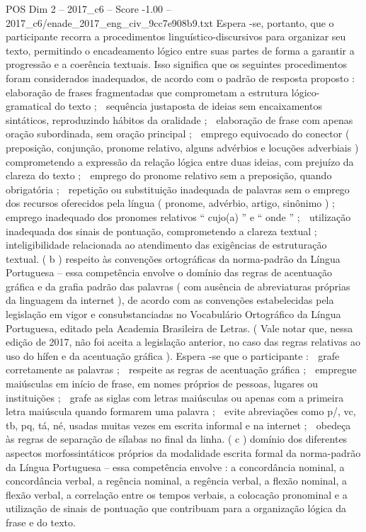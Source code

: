 \begin{textsample}{POS Dim 2 – 2017\_c6 – Score -1.00 – 2017\_c6/enade\_2017\_eng\_civ\_9cc7e908b9.txt}
Espera -se, portanto, que o participante recorra a procedimentos linguístico-discursivos para organizar seu texto, permitindo o encadeamento lógico entre suas partes de forma a garantir a progressão e a coerência textuais.
Isso significa que os seguintes procedimentos foram considerados inadequados, de acordo com o padrão de resposta proposto :  elaboração de frases fragmentadas que comprometam a estrutura lógico-gramatical do texto ;  sequência justaposta de ideias sem encaixamentos sintáticos, reproduzindo hábitos da oralidade ;  elaboração de frase com apenas oração subordinada, sem oração principal ;  emprego equivocado do conector ( preposição, conjunção, pronome relativo, alguns advérbios e locuções adverbiais ) comprometendo a expressão da relação lógica entre duas ideias, com prejuízo da clareza do texto ;  emprego do pronome relativo sem a preposição, quando obrigatória ;  repetição ou substituição inadequada de palavras sem o emprego dos recursos oferecidos pela língua ( pronome, advérbio, artigo, sinônimo ) ;  emprego inadequado dos pronomes relativos “ cujo(a) ” e “ onde ” ;  utilização inadequada dos sinais de pontuação, comprometendo a clareza textual ;  inteligibilidade relacionada ao atendimento das exigências de estruturação textual. ( b ) respeito às convenções ortográficas da norma-padrão da Língua Portuguesa – essa competência envolve o domínio das regras de acentuação gráfica e da grafia padrão das palavras ( com ausência de abreviaturas próprias da linguagem da internet ), de acordo com as convenções estabelecidas pela legislação em vigor e consubstanciadas no Vocabulário Ortográfico da Língua Portuguesa, editado pela Academia Brasileira de Letras. ( Vale notar que, nessa edição de 2017, não foi aceita a legislação anterior, no caso das regras relativas ao uso do hífen e da acentuação gráfica ).
Espera -se que o participante :  grafe corretamente as palavras ;  respeite as regras de acentuação gráfica ;  empregue maiúsculas em início de frase, em nomes próprios de pessoas, lugares ou instituições ;  grafe as siglas com letras maiúsculas ou apenas com a primeira letra maiúscula quando formarem uma palavra ;  evite abreviações como p/, vc, tb, pq, tá, né, usadas muitas vezes em escrita informal e na internet ;  obedeça às regras de separação de sílabas no final da linha. ( c ) domínio dos diferentes aspectos morfossintáticos próprios da modalidade escrita formal da norma-padrão da Língua Portuguesa – essa competência envolve : a concordância nominal, a concordância verbal, a regência nominal, a regência verbal, a flexão nominal, a flexão verbal, a correlação entre os tempos verbais, a colocação pronominal e a utilização de sinais de pontuação que contribuam para a organização lógica da frase e do texto.

\end{textsample}
